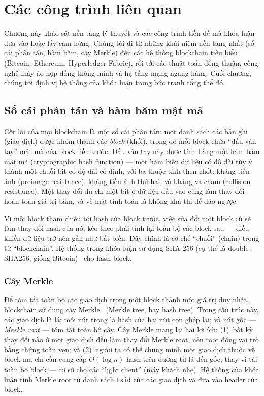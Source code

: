 \chapter{Các công trình liên quan}
\label{chap:related-work}

Chương này khảo sát nền tảng lý thuyết và các công trình tiền đề mà khóa luận
dựa vào hoặc lấy cảm hứng. Chúng tôi đi từ những khái niệm nền tảng nhất (sổ cái
phân tán, hàm băm, cây Merkle) đến các hệ thống blockchain tiêu biểu (Bitcoin,
Ethereum, Hyperledger Fabric), rồi tới các thuật toán đồng thuận, công nghệ máy
ảo hợp đồng thông minh và hạ tầng mạng ngang hàng. Cuối chương, chúng tôi định
vị hệ thống của khóa luận trong bức tranh tổng thể đó.

\section{Sổ cái phân tán và hàm băm mật mã}
\label{sec:dlt-hash}

Cốt lõi của mọi blockchain là một sổ cái phân tán: một danh sách các
bản ghi (giao dịch) được nhóm thành các \textit{block} (khối), trong đó mỗi
block chứa ``dấu vân tay'' mật mã của block liền trước. Dấu vân tay này được
tính bằng một hàm băm mật mã (cryptographic hash function) --- một hàm
biến dữ liệu có độ dài tùy ý thành một chuỗi bit có độ dài cố định, với ba thuộc
tính then chốt: kháng tiền ảnh (preimage resistance), kháng tiền ảnh thứ hai, và
kháng va chạm (collision resistance). Một thay đổi dù chỉ một bit ở dữ liệu đầu
vào cũng làm thay đổi hoàn toàn giá trị băm, và về mặt tính toán là không khả
thi để đảo ngược.

Vì mỗi block tham chiếu tới hash của block trước, việc sửa đổi một block cũ sẽ
làm thay đổi hash của nó, kéo theo phải tính lại toàn bộ các block sau --- điều
khiến dữ liệu trở nên gần như bất biến. Đây chính là cơ chế ``chuỗi''
(chain) trong từ ``blockchain''. Hệ thống trong khóa luận sử dụng SHA-256 (cụ
thể là double-SHA256, giống Bitcoin)~\cite{fips180,nakamoto2008bitcoin} cho hash
block.

\subsection{Cây Merkle}

Để tóm tắt toàn bộ các giao dịch trong một block thành một giá trị duy nhất,
blockchain sử dụng cây Merkle~\cite{merkle1979} (Merkle tree, hay hash
tree). Trong cấu trúc này, các giao dịch là lá; mỗi nút trong là hash của hai
nút con ghép lại; và nút gốc --- \textit{Merkle root} --- tóm tắt toàn bộ cây.
Cây Merkle mang lại hai lợi ích: (1)~bất kỳ thay đổi nào ở một giao dịch đều làm
thay đổi Merkle root, nên root đóng vai trò bằng chứng toàn vẹn; và (2)~người ta
có thể chứng minh một giao dịch thuộc về block mà chỉ cần cung cấp $O(\log n)$
hash trên đường từ lá đến gốc, thay vì tải toàn bộ block --- cơ sở cho các
``light client'' (máy khách nhẹ). Hệ thống của khóa luận tính Merkle root từ
danh sách \texttt{txid} của các giao dịch và đưa vào header của block.


